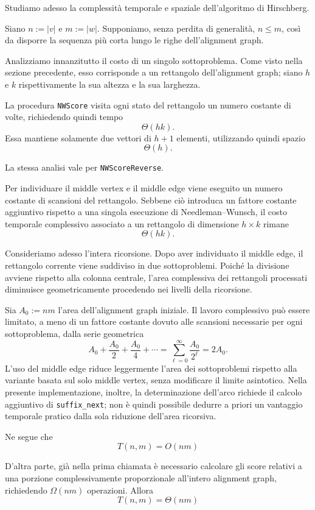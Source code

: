 Studiamo adesso la complessità temporale e spaziale dell'algoritmo di Hirschberg.

Siano $n:=|v|$ e $m:=|w|$.
Supponiamo, senza perdita di generalità, $n \leq m$, così da disporre la sequenza più corta
lungo le righe dell'alignment graph.

Analizziamo innanzitutto il costo di un singolo sottoproblema.
Come visto nella sezione precedente, esso corrisponde a un rettangolo dell'alignment graph;
siano $h$ e $k$ rispettivamente la sua altezza e la sua larghezza.

La procedura \texttt{NWScore} visita ogni stato del rettangolo un numero costante di volte,
richiedendo quindi tempo
\[
    \Theta(hk).
\]
Essa mantiene solamente due vettori di $h+1$ elementi, utilizzando quindi spazio
\[
    \Theta(h).
\]

La stessa analisi vale per \texttt{NWScoreReverse}.

Per individuare il middle vertex e il middle edge viene eseguito un numero costante di scansioni del rettangolo.
Sebbene ciò introduca un fattore costante 
aggiuntivo rispetto a una singola esecuzione di Needleman--Wunsch, il costo temporale complessivo associato
a un rettangolo di dimensione $h  \times k$ rimane
\[
    \Theta(hk).
\]

Consideriamo adesso l'intera ricorsione.
Dopo aver individuato il middle edge, il rettangolo corrente viene suddiviso in due sottoproblemi.
Poiché la divisione avviene rispetto alla colonna centrale, l'area complessiva dei rettangoli processati
diminuisce geometricamente procedendo nei livelli della ricorsione.

Sia $A_{0}:=nm$ l'area dell'alignment graph iniziale. Il lavoro complessivo può essere limitato, a meno di un fattore
costante dovuto alle scansioni necessarie per ogni sottoproblema, dalla serie geometrica
\[
    A_{0} + \frac{A_{0}}{2} + \frac{A_{0}}{4} + \cdots = \sum^{\infty}_{\ell = 0}\frac{A_{0}}{2^{\ell}}=2 A_{0}.
\]
L'uso del middle edge riduce leggermente l'area dei sottoproblemi rispetto alla variante basata sul solo middle vertex,
senza modificare il limite asintotico. Nella presente implementazione, inoltre, la determinazione dell'arco richiede il calcolo
aggiuntivo di \texttt{suffix\_next}; non è quindi possibile dedurre a priori un vantaggio temporale pratico dalla sola riduzione dell'area ricorsiva.

Ne segue che
\[
    T(n,m) = O(nm)
\]

D'altra parte, già nella prima chiamata è necessario calcolare gli score relativi a una porzione complessivamente proporzionale all'intero
alignment graph, richiedendo $\Omega(nm)$ operazioni. Allora
\[
    T(n,m) = \Theta(nm)
\]

